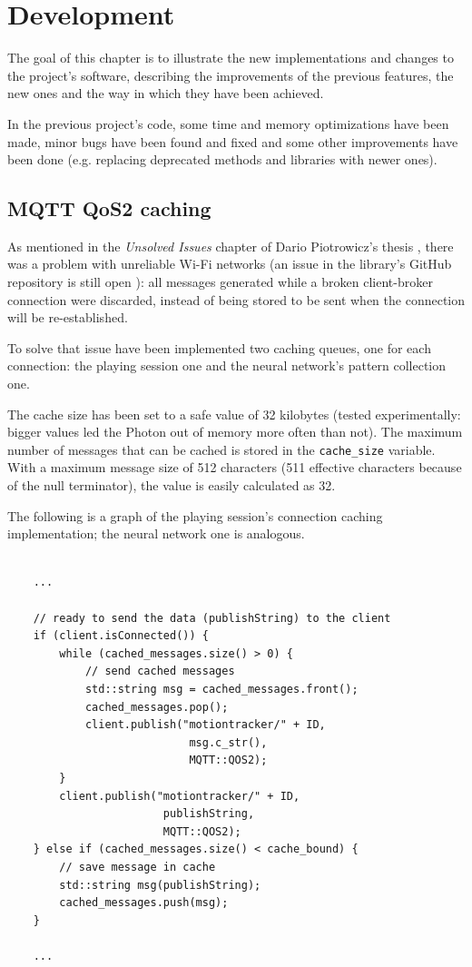 \chapter{Development}
The goal of this chapter is to illustrate the new implementations and changes to the project's software, describing the improvements of the previous features, the new ones and the way in which they have been achieved.
\bigbreak

In the previous project's code, some time and memory optimizations have been made, minor bugs have been found and fixed and some other improvements have been done (e.g. replacing deprecated methods and libraries with newer ones).

\section{MQTT QoS2 caching}
As mentioned in the \textit{Unsolved Issues} chapter of Dario Piotrowicz's thesis \cite{Pio19}, there was a problem with unreliable Wi-Fi networks (an issue in the library's GitHub repository is still open \cite{githubQos2Issue}): all messages generated while a broken client-broker connection were discarded, instead of being stored to be sent when the connection will be re-established.

To solve that issue have been implemented two caching queues, one for each connection: the playing session one and the neural network's pattern collection one.

The cache size has been set to a safe value of 32 kilobytes (tested experimentally: bigger values led the Photon out of memory more often than not). The maximum number of messages that can be cached is stored in the \texttt{cache\_size} variable. With a maximum message size of 512 characters (511 effective characters because of the null terminator), the value is easily calculated as 32.

The following is a graph of the playing session's connection caching implementation; the neural network one is analogous.
\bigbreak

\begin{lstlisting}[style=CPPStyle]

	...

	// ready to send the data (publishString) to the client
	if (client.isConnected()) {
        while (cached_messages.size() > 0) {
			// send cached messages
            std::string msg = cached_messages.front();
            cached_messages.pop();
			client.publish("motiontracker/" + ID,
							msg.c_str(),
							MQTT::QOS2);
        }
		client.publish("motiontracker/" + ID,
						publishString,
						MQTT::QOS2);
    } else if (cached_messages.size() < cache_bound) {
		// save message in cache
        std::string msg(publishString);
        cached_messages.push(msg);
    }

	...

\end{lstlisting}
\bigbreak

